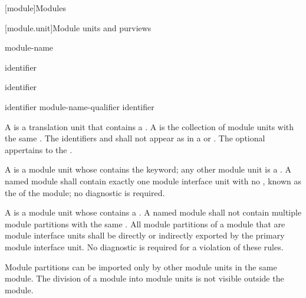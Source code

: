 [module]{Modules}%


[module.unit]{Module units and purviews}

\begin{bnf}
\br
      module-name   \terminal{;}
\end{bnf}

\begin{bnf}
\br
     identifier
\end{bnf}

\begin{bnf}
\br
    \terminal{:}  identifier
\end{bnf}

\begin{bnf}
\br
    identifier \br
    module-name-qualifier identifier 
\end{bnf}

\pnum
A  is a translation unit that contains
a .
A  is the
collection of module units with the same .
The identifiers  and 
shall not appear as 
in a  or .
The optional 
appertains to the .

\pnum
A  is a module unit whose
 contains the  keyword;
any other module unit is a .
A named module shall contain exactly one module interface unit
with no , known as the
 of the module;
no diagnostic is required.

\pnum
A  is
a module unit whose  contains
a .
A named module shall not contain multiple module partitions with
the same .
All module partitions of a module
that are module interface units
shall be directly or indirectly exported
by the primary module interface unit.
No diagnostic is required for a violation of these rules.
\begin{note}
Module partitions can be imported only by
other module units in the same module.
The division of a module into module units
is not visible outside the module.
\end{note}

